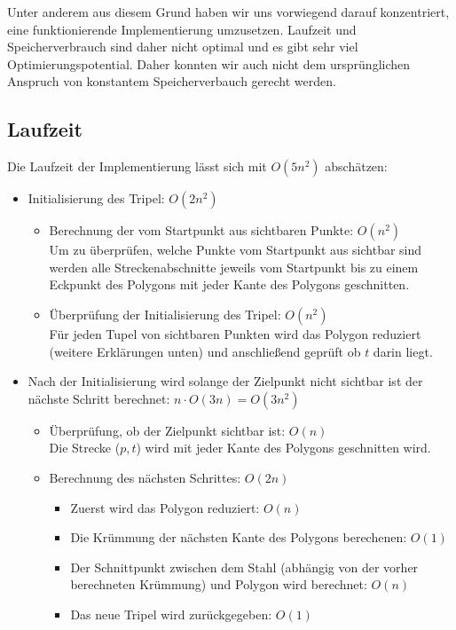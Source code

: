     Unter anderem aus diesem Grund haben wir uns vorwiegend darauf konzentriert, eine
    funktionierende Implementierung umzusetzen. Laufzeit und Speicherverbrauch
    sind daher nicht optimal und es gibt sehr viel Optimierungspotential. Daher konnten 
    wir auch nicht dem ursprünglichen Anspruch von konstantem Speicherverbauch gerecht werden.

\newpage
  \subsection{Laufzeit}

  Die Laufzeit der Implementierung lässt sich mit $O(5n^2)$ abschätzen:

  \begin{itemize}
  \item Initialisierung des Tripel: $O(2n^2)$
        \begin{itemize}
        \item Berechnung der vom Startpunkt aus sichtbaren Punkte: $O(n^2)$\\
        Um zu überprüfen, welche Punkte vom Startpunkt aus sichtbar sind
        werden alle Streckenabschnitte jeweils vom Startpunkt bis zu einem
        Eckpunkt des Polygons mit jeder Kante des Polygons geschnitten.
        \item Überprüfung der Initialisierung des Tripel: $O(n^2)$\\
        Für jeden Tupel von sichtbaren Punkten wird das Polygon reduziert
        (weitere Erklärungen unten) und anschließend geprüft ob $t$ darin liegt.
        \end{itemize}
  \item Nach der Initialisierung wird solange der Zielpunkt nicht sichtbar ist
        der nächste Schritt berechnet: $n \cdot O(3n) = O(3n^2)$
        \begin{itemize}
        \item Überprüfung, ob der Zielpunkt sichtbar ist: $O(n)$\\
        Die Strecke ($p,t$) wird mit jeder Kante des Polygons geschnitten wird.
        \item Berechnung des nächsten Schrittes: $O(2n)$
          \begin{itemize}
          \item Zuerst wird das Polygon reduziert: $O(n)$
          \item Die Krümmung der nächsten Kante des Polygons berechenen: $O(1)$
          \item Der Schnittpunkt zwischen dem Stahl (abhängig von der vorher
          berechneten Krümmung) und Polygon wird berechnet: $O(n)$
          \item Das neue Tripel wird zurückgegeben: $O(1)$
          \end{itemize}
        \end{itemize}
  \end{itemize}

